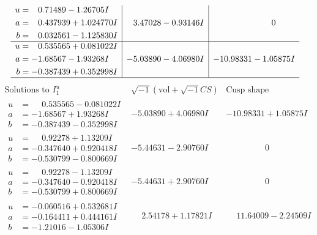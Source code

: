 \documentclass[1p]{elsarticle_modified}
\theoremstyle{definition}
\newcommand{\I}{\sqrt{-1}}
\begin{document}
$$\begin{array}{c|c|c}
\begin{aligned}
u &= \phantom{-}0.71489 - 1.26705 I \\
a &= \phantom{-}0.437939 + 1.024770 I \\
b &= \phantom{-}0.032561 - 1.125830 I\end{aligned}
 & \phantom{-}3.47028 - 0.93146 I & \phantom{-0.000000 } 0 \\ \hline\begin{aligned}
u &= \phantom{-}0.535565 + 0.081022 I \\
a &= -1.68567 - 1.93268 I \\
b &= -0.387439 + 0.352998 I\end{aligned}
 & -5.03890 - 4.06980 I & -10.98331 - 1.05875 I\\
 \hline 
 \end{array}$$\newpage$$\begin{array}{c|c|c}  
\text{Solutions to }I^u_{1}& \I (\text{vol} + \sqrt{-1}CS) & \text{Cusp shape}\\
 \hline 
\begin{aligned}
u &= \phantom{-}0.535565 - 0.081022 I \\
a &= -1.68567 + 1.93268 I \\
b &= -0.387439 - 0.352998 I\end{aligned}
 & -5.03890 + 4.06980 I & -10.98331 + 1.05875 I \\ \hline\begin{aligned}
u &= \phantom{-}0.92278 + 1.13209 I \\
a &= -0.347640 + 0.920418 I \\
b &= -0.530799 - 0.800669 I\end{aligned}
 & -5.44631 - 2.90760 I & \phantom{-0.000000 } 0 \\ \hline\begin{aligned}
u &= \phantom{-}0.92278 - 1.13209 I \\
a &= -0.347640 - 0.920418 I \\
b &= -0.530799 + 0.800669 I\end{aligned}
 & -5.44631 + 2.90760 I & \phantom{-0.000000 } 0 \\ \hline\begin{aligned}
u &= -0.060516 + 0.532681 I \\
a &= -0.164411 + 0.444161 I \\
b &= -1.21016 - 1.05306 I\end{aligned}
 & \phantom{-}2.54178 + 1.17821 I & \phantom{-}11.64009 - 2.24509 I \\ \hline\begin{aligned}

\end{aligned}
\end{array}$$
\end{document}
